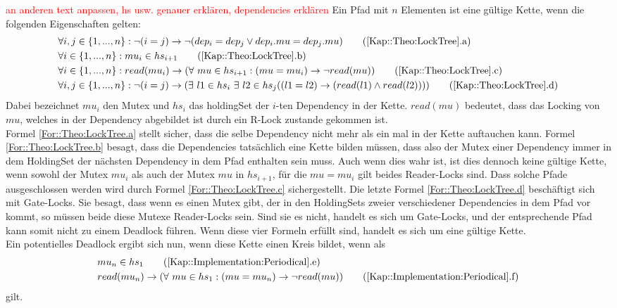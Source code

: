 \textcolor{red}{an anderen text anpassen, hs usw. genauer erklären, dependencies
erklären}
Ein Pfad mit $n$
Elementen ist eine gültige Kette, wenn die folgenden Eigenschaften gelten:
\begin{align}
  &\forall i, j \in \{1,...,n\}: \lnot (i = j) \rightarrow \lnot (dep_i = dep_j \lor dep_i.mu = 
  dep_j.mu) \tag{\ref{Kap::Theo:LockTree}.a}
  \label{For::Theo:LockTree.a}\\
  &\forall i \in \{1,...,n\}: mu_i \in hs_{i+1} 
  \tag{\ref{Kap::Theo:LockTree}.b}
  \label{For::Theo:LockTree.b}\\
  &\forall i \in \{1,...,n\}: read(mu_i) \rightarrow 
  (\forall\ mu \in hs_{i+1}:(mu = mu_i) \to \lnot read(mu))
  \tag{\ref{Kap::Theo:LockTree}.c}
  \label{For::Theo:LockTree.c}\\
  &\forall i, j \in \{1,...,n\}: \lnot (i = j) \rightarrow 
  (\exists\ l1 \in hs_i\ \exists\ l2 \in hs_j ((l1 = l2) \rightarrow 
  (read(l1) \land read(l2)))) 
  \tag{\ref{Kap::Theo:LockTree}.d}
  \label{For::Theo:LockTree.d}
\end{align}
Dabei bezeichnet $mu_i$ den Mutex und $hs_i$ das holdingSet der $i$-ten 
Dependency in der Kette. $read(mu)$ bedeutet, dass das Locking von $mu$, welches 
in der Dependency abgebildet ist durch ein R-Lock zustande gekommen ist.\\
Formel \ref{For::Theo:LockTree.a} stellt sicher, dass die selbe 
Dependency nicht mehr als ein mal in der Kette auftauchen kann. Formel 
\ref{For::Theo:LockTree.b} besagt, dass die Dependencies tatsächlich
eine Kette bilden müssen, dass also der Mutex einer Dependency immer in dem 
HoldingSet der nächsten Dependency in dem Pfad enthalten sein muss. 
Auch wenn dies wahr ist, ist dies dennoch keine gültige Kette, wenn sowohl der
Mutex $mu_i$ als auch der Mutex $mu$ in $hs_{i+1}$, für die $mu = mu_i$ gilt 
beides Reader-Locks sind. Dass solche Pfade ausgeschlossen werden wird durch 
Formel \ref{For::Theo:LockTree.c} sichergestellt. Die letzte Formel 
\ref{For::Theo:LockTree.d} beschäftigt sich mit Gate-Locks. 
Sie besagt, dass wenn es einen Mutex gibt, 
der in den HoldingSets zweier verschiedener Dependencies in dem Pfad vor kommt, 
so müssen beide diese Mutexe Reader-Locks sein. Sind sie es nicht, handelt es 
sich um Gate-Locks, und der entsprechende Pfad kann somit nicht zu einem 
Deadlock führen. Wenn diese vier Formeln erfüllt sind, handelt es sich um eine 
gültige Kette.\\
Ein potentielles Deadlock ergibt sich nun, wenn diese Kette einen Kreis 
bildet, wenn als 
\begin{align}
  &mu_n \in hs_{1} 
  \tag{\ref{Kap::Implementation:Periodical}.e}
  \label{For::Implementation:Periodical.e}\\
  &read(mu_n) \rightarrow 
  (\forall\ mu \in hs_{1}: (mu = mu_n) \to \lnot read(mu))
  \tag{\ref{Kap::Implementation:Periodical}.f}
  \label{For::Implementation:Periodical.f}
\end{align}
gilt.


%    
%    
%    

